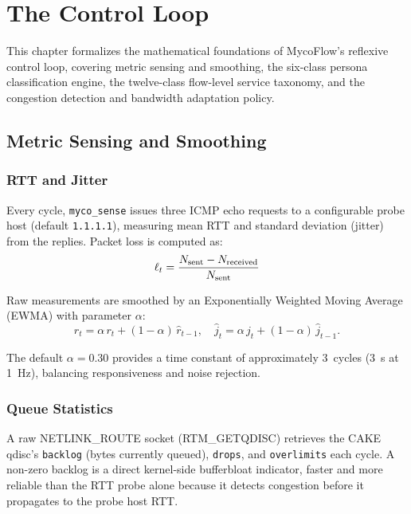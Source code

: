
\chapter{The Control Loop}\label{chapter:control}

This chapter formalizes the mathematical foundations of MycoFlow's reflexive control loop, covering metric sensing and smoothing, the six-class persona classification engine, the twelve-class flow-level service taxonomy, and the congestion detection and bandwidth adaptation policy.

\section{Metric Sensing and Smoothing}

\subsection{RTT and Jitter}

Every cycle, \texttt{myco\_sense} issues three ICMP echo requests to a configurable probe host (default \texttt{1.1.1.1}), measuring mean RTT and standard deviation (jitter) from the replies. Packet loss is computed as:
\begin{equation}
  \ell_t = \frac{N_{\rm sent} - N_{\rm received}}{N_{\rm sent}}
  \label{eq:loss}
\end{equation}

Raw measurements are smoothed by an Exponentially Weighted Moving Average (EWMA) with parameter $\alpha$:
\begin{equation}
  \hat{r}_t = \alpha\, r_t + (1-\alpha)\,\hat{r}_{t-1}, \quad
  \hat{j}_t = \alpha\, j_t + (1-\alpha)\,\hat{j}_{t-1}.
  \label{eq:ewma}
\end{equation}

The default $\alpha = 0.30$ provides a time constant of approximately 3~cycles (3~s at 1~Hz), balancing responsiveness and noise rejection.

\subsection{Queue Statistics}

A raw NETLINK\_ROUTE socket (RTM\_GETQDISC) retrieves the CAKE qdisc's \texttt{backlog} (bytes currently queued), \texttt{drops}, and \texttt{overlimits} each cycle. A non-zero backlog is a direct kernel-side bufferbloat indicator, faster and more reliable than the RTT probe alone because it detects congestion before it propagates to the probe host RTT.

